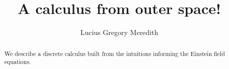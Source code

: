 \def\lastname{Meredith}

\title{A calculus from outer space!}

\author{ Lucius Gregory Meredith         
}
 

\maketitle              %


\begin{abstract}

  We describe a discrete calculus built from the intuitions informing
  the Einstein field equations.

\end{abstract}



